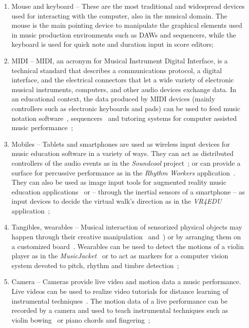 \documentclass[10pt,journal,compsoc]{IEEEtran}
\newcommand{\node}[1]{{\fontfamily{cmss}\selectfont #1}}
\begin{document}
\begin{enumerate}[label=1.\arabic*.,leftmargin=0.7cm,listparindent=-\leftmargin, start=0]
\begin{enumerate}[label=1.1.\arabic*.,leftmargin=0.9cm,listparindent=-\leftmargin, start=0]
\item \node{Mouse and keyboard} -- These are the most traditional and widespread devices used for interacting with the computer, also in the musical domain. The mouse is the main pointing device to manipulate the graphical elements used in music production environments such as DAWs and sequencers, while the keyboard is used for quick note and duration input in score editors;
\item \node{MIDI} -- MIDI, an acronym for Musical Instrument Digital Interface, is a technical standard that describes a communications protocol, a digital interface, and the electrical connectors that let a wide variety of electronic musical instruments, computers, and other audio devices exchange data. In an educational context, the data produced by MIDI devices (mainly controllers such as electronic keyboards and pads) can be used to feed music notation software~\cite{schroth2009using}, sequencers~\cite{mcdowall2003music} and tutoring systems for computer assisted music performance~\cite{barakonyi2005augmented};
\item \node{Mobiles} -- Tablets and smartphones are used as wireless input devices for music education software in a variety of ways. They can act as distributed controllers of the audio events as in the \textit{Soundcool} project~\cite{berbel2017sound}; or can provide a surface for percussive performance as in the \textit{Rhythm Workers} application~\cite{begel2018rhythm}. They can also be used as image input tools for augmented reality music education applications~\cite{rusinol2018augmented} or -- through the inertial sensors of a smartphone -- as input devices to decide the virtual walk's direction as in the \textit{VR4EDU} application~\cite{degli2019mobile};
\item \node{Tangibles, wearables} -- Musical interaction of sensorized physical objects may happen through their creative manipulation~\cite{weinberg2002beatbug} and~\cite{bakker2010moso}) or by arranging them on a customized board~\cite{parra2014}. Wearables can be used to detect the motions of a violin player as in the \textit{MusicJacket}~\cite{johnson2010musicjacket} or to act as markers for a computer vision system devoted to pitch, rhythm and timbre detection~\cite{martins2015teaching};
\item \node{Camera} -- Cameras provide live video and motion data a music performance. Live videos can be used to realize video tutorials for distance learning of instrumental techniques~\cite{palazon2014vodcasting}. The motion data of a live performance can be recorded by a camera and used to teach instrumental techniques such as violin bowing~\cite{van2009towards} or piano chords and fingering~\cite{goodwin2013key};

\end{enumerate}
\end{enumerate}
\end{document}
